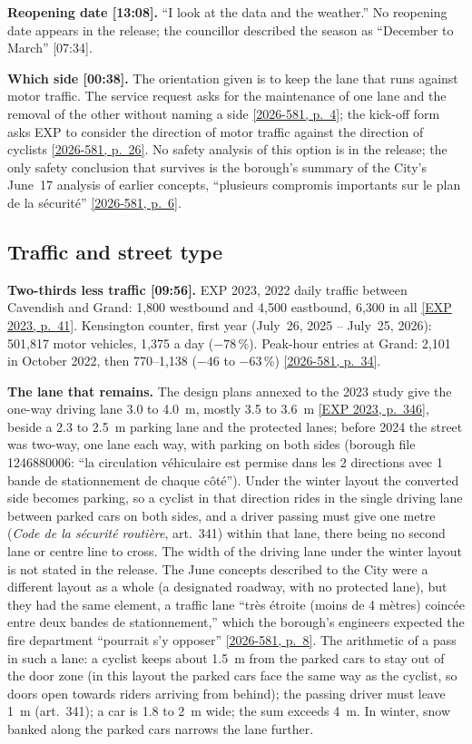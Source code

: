 \documentclass[11pt,letterpaper]{article}
\newcommand{\repourl}{https://github.com/OpenMobilityData/Terrebonne-open-sources}
\newcommand{\pagesurl}{https://openmobilitydata.github.io/Terrebonne-access-requests}
\newcommand{\cliptime}[1]{\textsf{\small[#1]}}
\newcommand{\pgl}[2]{\href{\pagesurl/2026-581/raw/01_emails_mandate_counts.pdf\#page=#1}{\textsf{\small[2026-581, p.~#2]}}}
\newcommand{\pg}[1]{\pgl{#1}{#1}}
\newcommand{\exppg}[1]{\href{\repourl/blob/main/2023-exp-mobility-study/raw/EXP_Etude_de_mobilite_rue_de_Terrebonne_2023.pdf}{\textsf{\small[EXP 2023, p.~#1]}}}
\begin{document}
\textbf{Reopening date \cliptime{13:08}.} ``I look at the data and the
weather.'' No reopening date appears in the release; the councillor
described the season as ``December to March'' \cliptime{07:34}.

\textbf{Which side \cliptime{00:38}.} The orientation given is to keep the
lane that runs against motor traffic. The service request asks for the
maintenance of one lane and the removal of the other without naming a side
\pg{4}; the kick-off form asks EXP to consider the direction of motor
traffic against the direction of cyclists \pg{26}. No safety analysis of
this option is in the release; the only safety conclusion that survives is
the borough's summary of the City's June~17 analysis of earlier concepts,
``plusieurs compromis importants sur le plan de la sécurité'' \pg{6}.

\subsection{Traffic and street type}

\textbf{Two-thirds less traffic \cliptime{09:56}.} EXP 2023, 2022 daily
traffic between Cavendish and Grand: 1{,}800 westbound and 4{,}500
eastbound, 6{,}300 in all \exppg{41}. Kensington counter, first year
(July~26, 2025 -- July~25, 2026): 501{,}817 motor vehicles, 1{,}375 a day
($-78$\,\%). Peak-hour entries at Grand: 2{,}101 in October 2022, then
770--1{,}138 ($-46$ to $-63$\,\%) \pg{34}.

\textbf{The lane that remains.} The design plans annexed to the 2023 study
give the one-way driving lane 3.0 to 4.0~m, mostly 3.5 to 3.6~m
\exppg{346}, beside a 2.3 to 2.5~m parking lane and the protected lanes;
before 2024 the street was two-way, one lane each way, with parking on both
sides (borough file 1246880006: ``la circulation véhiculaire est permise
dans les 2 directions avec 1 bande de stationnement de chaque côté''). Under
the winter layout the converted side becomes parking, so a cyclist in that
direction rides in the single driving lane between parked cars on both
sides, and a driver passing must give one metre (\emph{Code de la sécurité
routière}, art.~341) within that lane, there being no second lane or centre
line to cross. The width of the driving lane under the winter layout is not
stated in the release. The June concepts described to the City were a
different layout as a whole (a designated roadway, with no protected
lane), but they had the same element, a traffic lane ``très étroite (moins
de 4 mètres) coincée entre deux bandes de stationnement,'' which the
borough's engineers expected the fire department ``pourrait s'y opposer''
\pg{8}. The arithmetic of a pass in such a lane: a cyclist keeps about
1.5~m from the parked cars to stay out of the door zone (in this layout the
parked cars face the same way as the cyclist, so doors open towards riders
arriving from behind); the passing driver must leave 1~m (art.~341); a car
is 1.8 to 2~m wide; the sum exceeds 4~m. In winter, snow banked along the
parked cars narrows the lane further.
\end{document}
